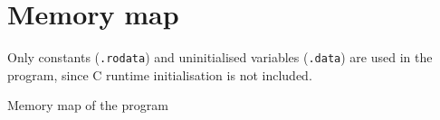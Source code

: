 \section{Memory map}

Only constants (\texttt{.rodata}) and uninitialised variables (\texttt{.data}) are used in the program, since C runtime initialisation is not included.

\begin{table}[htbp]
    \centering
    \resizebox{\textwidth}{!}{
        
    }
    \caption{
        Memory map of the program
    }\label{tab:map}
\end{table}
